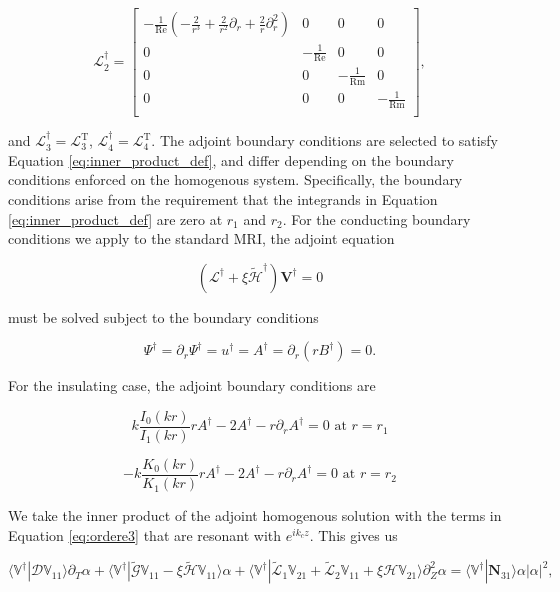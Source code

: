 \documentclass{emulateapj}
\newcommand{\beq}{\begin{equation}}
\newcommand{\eeq}{\end{equation}}
\newcommand\reye{\mathrm{Re}}
\newcommand\reym{\mathrm{Rm}}
\begin{document}
\beq
\mathcal{L}_2^\dagger = \left[\begin{matrix}
-\frac{1}{\reye}(-\frac{2}{r^3} + \frac{2}{r^2}\partial_r + \frac{2}{r}\partial_r^2) & 0 & 0 & 0 \\
0 & -\frac{1}{\reye} & 0 & 0 \\
0 & 0 & -\frac{1}{\reym} & 0 \\
0 & 0 & 0 & -\frac{1}{\reym} \\
\end{matrix}\right],
\eeq

and $\mathcal{L}_3^\dagger = \mathcal{L}_3^\mathrm{T}$, $\mathcal{L}_4^\dagger = \mathcal{L}_4^\mathrm{T}$. The adjoint boundary conditions are selected to satisfy Equation \ref{eq:inner_product_def}, and differ depending on the boundary conditions enforced on the homogenous system. Specifically, the boundary conditions arise from the requirement that the integrands in Equation \ref{eq:inner_product_def} are zero at $r_1$ and $r_2$. For the conducting boundary conditions we apply to the standard MRI, the adjoint equation 

\beq\label{eq:adjoint}
(\mathcal{L}^\dagger + \xi \widetilde{\mathcal{H}}^\dagger)\mathbf{V}^\dagger = 0
\eeq

must be solved subject to the boundary conditions

\beq
\Psi^\dagger = \partial_r \Psi^\dagger = u^\dagger = A^\dagger = \partial_r (r B^\dagger) = 0.
\eeq

For the insulating case, the adjoint boundary conditions are

\beq
k \frac{I_0 (k r)}{I_1 (k r)} r A^\dagger - 2 A^\dagger - r \partial_r A^\dagger = 0 \, \, \mathrm{at} \, \,   r = r_1
\eeq

\beq
- k \frac{K_0 (k r)}{K_1 (k r)} r A^\dagger - 2 A^\dagger - r \partial_r A^\dagger = 0 \, \, \mathrm{at} \, \,   r = r_2
\eeq

We take the inner product of the adjoint homogenous solution with the terms in Equation \ref{eq:ordere3} that are resonant with $e^{i k_c z}$. This gives us

\beq
\langle \mathbb{V}^\dagger | \mathcal{D} \mathbb{V}_{11} \rangle \partial_T \alpha + \langle  \mathbb{V}^\dagger | \widetilde{\mathcal{G}} \mathbb{V}_{11} - \xi \widetilde{\mathcal{H}} \mathbb{V}_{11} \rangle \alpha +  \langle \mathbb{V}^\dagger | \widetilde{\mathcal{L}}_1 \mathbb{V}_{21} + \widetilde{\mathcal{L}}_2 \mathbb{V}_{11} + \xi \mathcal{H} \mathbb{V}_{21} \rangle \partial_Z^2 \alpha = \langle \mathbb{V}^\dagger | \mathbf{N}_{31} \rangle \alpha |\alpha|^2,
\eeq
\end{document}

